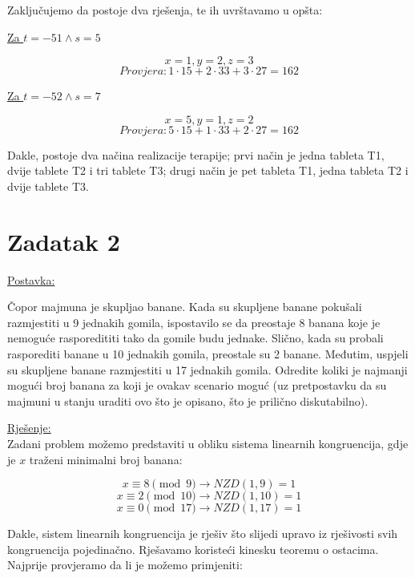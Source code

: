 \documentclass[12pt]{article}
\begin{document}
Zaključujemo da postoje dva rješenja, te ih uvrštavamo u opšta:\vspace{1mm}

\underline{Za $t = - 51 \land s = 5$}\vspace{1mm}

$$x = 1, y = 2, z = 3$$
$$Provjera: 1 \cdot 15 + 2 \cdot 33 + 3 \cdot 27 = 162$$\vspace{1mm}

\underline{Za $t = - 52 \land s = 7$}

$$x = 5, y = 1, z = 2$$
$$Provjera: 5 \cdot 15 + 1 \cdot 33 + 2 \cdot 27 = 162$$\vspace{1mm}

Dakle, postoje dva načina realizacije terapije; prvi način je jedna tableta T1, dvije tablete T2 i tri tablete T3; drugi način je pet tableta T1, jedna tableta T2 i dvije tablete T3.

\newpage

\section*{Zadatak 2\label{Z2}}

\underline{Postavka:}

Čopor majmuna je skupljao banane. Kada su skupljene banane pokušali razmjestiti u 9 jednakih gomila, ispostavilo se da preostaje 8 banana koje je nemoguće rasporedititi tako da gomile budu jednake. Slično, kada su probali rasporediti banane u 10 jednakih gomila, preostale su 2 banane. Međutim, uspjeli su skupljene banane razmjestiti u 17 jednakih gomila. Odredite koliki je najmanji mogući broj banana za koji je ovakav scenario moguć (uz pretpostavku da su majmuni u stanju uraditi ovo što je opisano, što je prilično diskutabilno).

\underline{Rješenje:}\\

\hspace{0.65cm}Zadani problem možemo predstaviti u obliku sistema linearnih kongruencija, gdje je $x$ traženi minimalni broj banana:

$$x \equiv 8 \pmod{9} \to NZD(1, 9) = 1$$
$$x \equiv 2 \pmod{10} \to NZD(1, 10) = 1$$
$$x \equiv 0 \pmod{17} \to NZD(1, 17) = 1$$\vspace{1mm}

Dakle, sistem linearnih kongruencija je rješiv što slijedi upravo iz rješivosti svih kongruencija pojedinačno. Rješavamo koristeći kinesku teoremu o ostacima. Najprije provjeramo da li je možemo primjeniti: 
\end{document}
